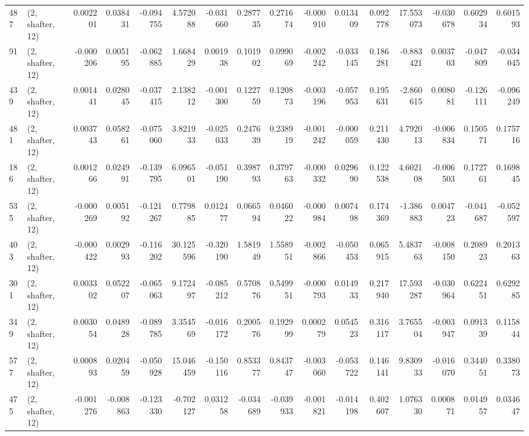 \begin{tabular}{llrrrrrrrrrrrrrr}
487 &  (2, shafter, 12) &   0.002201 &  0.038431 & -0.094755 &    4.572088 & -0.031660 &   0.287735 &   0.271674 & -0.000910 &  0.013409 &  0.092778 &   17.553073 & -0.030678 &   0.602934 &   0.601593 \\
91  &  (2, shafter, 12) &  -0.000206 &  0.005195 & -0.062885 &    1.668429 &  0.001938 &   0.101902 &   0.099069 & -0.002242 & -0.033145 &  0.186281 &   -0.883421 &  0.003703 &  -0.047809 &  -0.034045 \\
439 &  (2, shafter, 12) &   0.001441 &  0.028045 & -0.037415 &    2.138212 & -0.001300 &   0.122759 &   0.120873 & -0.003196 & -0.057953 &  0.195631 &   -2.860615 &  0.008081 &  -0.126111 &  -0.096249 \\
481 &  (2, shafter, 12) &   0.003743 &  0.058261 & -0.075060 &    3.821933 & -0.025033 &   0.247639 &   0.238919 & -0.001242 & -0.000059 &  0.211430 &    4.792013 & -0.006834 &   0.150571 &   0.175716 \\
186 &  (2, shafter, 12) &   0.001266 &  0.024991 & -0.139795 &    6.096501 & -0.051190 &   0.398793 &   0.379763 & -0.000332 &  0.029690 &  0.122538 &    4.602108 & -0.006503 &   0.172761 &   0.169845 \\
535 &  (2, shafter, 12) &  -0.000269 &  0.005192 & -0.121267 &    0.779885 &  0.012477 &   0.066594 &   0.046022 & -0.000984 &  0.007498 &  0.174369 &   -1.386883 &  0.004723 &  -0.041687 &  -0.052597 \\
403 &  (2, shafter, 12) &  -0.000422 &  0.002993 & -0.116202 &   30.125596 & -0.320190 &   1.581949 &   1.558951 & -0.002866 & -0.050453 &  0.065915 &    5.483763 & -0.008150 &   0.208923 &   0.201363 \\
301 &  (2, shafter, 12) &   0.003302 &  0.052207 & -0.065063 &    9.172497 & -0.085212 &   0.570876 &   0.549951 & -0.000793 &  0.014933 &  0.217940 &   17.593287 & -0.030964 &   0.622451 &   0.629285 \\
349 &  (2, shafter, 12) &   0.003054 &  0.048928 & -0.089785 &    3.354569 & -0.016172 &   0.200576 &   0.192999 &  0.000279 &  0.054523 &  0.316117 &    3.765504 & -0.003947 &   0.091339 &   0.115844 \\
577 &  (2, shafter, 12) &   0.000893 &  0.020459 & -0.050928 &   15.046459 & -0.150116 &   0.853377 &   0.843747 & -0.003060 & -0.053722 &  0.146141 &    9.830933 & -0.016070 &   0.344051 &   0.338073 \\
475 &  (2, shafter, 12) &  -0.001276 & -0.008863 & -0.123330 &   -0.702127 &  0.031258 &  -0.034689 &  -0.039933 & -0.001821 & -0.014198 &  0.402607 &    1.076330 &  0.000871 &   0.014957 &   0.034647 \\

\end{tabular}

